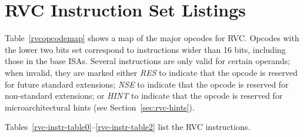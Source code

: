 \clearpage

\section{RVC Instruction Set Listings}

Table~\ref{rvcopcodemap} shows a map of the major opcodes for RVC.
Opcodes with the lower two bits set correspond to instructions wider
than 16 bits, including those in the base ISAs.  Several instructions
are only valid for certain operands; when invalid, they are marked
either {\em RES} to indicate that the opcode is reserved for future
standard extensions; {\em NSE} to indicate that the opcode is reserved
for non-standard extensions; or {\em HINT} to indicate that the opcode
is reserved for microarchitectural hints (see Section~\ref{sec:rvc-hints}).



Tables~\ref{rvc-instr-table0}--\ref{rvc-instr-table2} list the RVC instructions.

